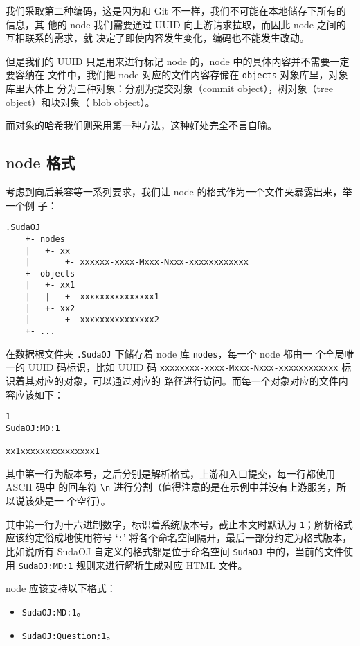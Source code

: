 我们采取第二种编码，这是因为和 Git 不一样，我们不可能在本地储存下所有的信息，其
他的 node 我们需要通过 UUID 向上游请求拉取，而因此 node 之间的互相联系的需求，就
决定了即使内容发生变化，编码也不能发生改动。

但是我们的 UUID 只是用来进行标记 node 的，node 中的具体内容并不需要一定要容纳在
文件中，我们把 node 对应的文件内容存储在 \verb|objects| 对象库里，对象库里大体上
分为三种对象：分别为提交对象（commit object），树对象（tree object）和块对象（
blob object）。

而对象的哈希我们则采用第一种方法，这种好处完全不言自喻。

\subsection{node 格式} \label{fbs::node}
考虑到向后兼容等一系列要求，我们让 node 的格式作为一个文件夹暴露出来，举一个例
子：

\begin{lstlisting}
.SudaOJ
    +- nodes
    |   +- xx
    |       +- xxxxxx-xxxx-Mxxx-Nxxx-xxxxxxxxxxxx
    +- objects
    |   +- xx1
    |   |   +- xxxxxxxxxxxxxxx1
    |   +- xx2
    |       +- xxxxxxxxxxxxxxx2
    +- ...
\end{lstlisting}

在数据根文件夹 \verb|.SudaOJ| 下储存着 node 库 \verb|nodes|，每一个 node 都由一
个全局唯一的 UUID 码标识，比如 UUID 码 %
\verb|xxxxxxxx-xxxx-Mxxx-Nxxx-xxxxxxxxxxxx| 标识着其对应的对象，可以通过对应的
路径进行访问。而每一个对象对应的文件内容应该如下：

\begin{lstlisting}
1
SudaOJ:MD:1

xx1xxxxxxxxxxxxxxx1
\end{lstlisting}

其中第一行为版本号，之后分别是解析格式，上游和入口提交，每一行都使用 ASCII 码中
的回车符 \verb|\n| 进行分割（值得注意的是在示例中并没有上游服务，所以说该处是一
个空行）。

其中第一行为十六进制数字，标识着系统版本号，截止本文时默认为 \verb|1|；解析格式
应该约定俗成地使用符号 `\verb|:|' 将各个命名空间隔开，最后一部分约定为格式版本，
比如说所有 SudaOJ 自定义的格式都是位于命名空间 \verb|SudaOJ| 中的，当前的文件使
用 \verb|SudaOJ:MD:1| 规则来进行解析生成对应 HTML 文件。

node 应该支持以下格式：
\begin{itemize}
    \item \verb|SudaOJ:MD:1|。
    \item \verb|SudaOJ:Question:1|。
\end{itemize}

